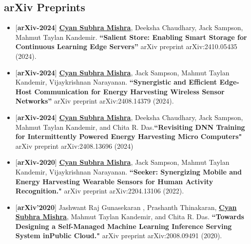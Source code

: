 \documentclass[letterpaper,11pt]{article}
\begin{document}
\subsection*{arXiv Preprints}
\begin{itemize}


\item \small{[\textbf{arXiv-2024}] \textbf{\underline{Cyan Subhra Mishra}}, Deeksha Chaudhary, Jack Sampson, Mahmut Taylan Kandemir. \textbf{``Salient Store: Enabling Smart Storage for Continuous Learning Edge Servers''} arXiv preprint arXiv:2410.05435 (2024).}

\item \small{[\textbf{arXiv-2024}] \textbf{\underline{Cyan Subhra Mishra}}, Jack Sampson, Mahmut Taylan Kandemir, Vijaykrishnan Narayanan. \textbf{``Synergistic and Efficient Edge-Host Communication for Energy Harvesting Wireless Sensor Networks''} arXiv preprint arXiv:2408.14379 (2024).}

\item \small{[\textbf{arXiv-2024}]  \textbf{\underline{Cyan Subhra Mishra}}, Deeksha Chaudhary, Jack Sampson, Mahmut Taylan Kandemir, and Chita R. Das.\textbf{``Revisiting DNN Training for Intermittently Powered Energy Harvesting Micro Computers"} arXiv preprint arXiv:2408.13696 (2024)}

\item \small{[\textbf{arXiv-2020}] \textbf{\underline{Cyan Subhra Mishra}}, Jack Sampson, Mahmut Taylan Kandemir, Vijaykrishnan Narayanan. \textbf{``Seeker: Synergizing Mobile and Energy Harvesting Wearable Sensors for Human Activity Recognition."} arXiv preprint arXiv:2204.13106 (2022).}

\item \small{[\textbf{arXiv'2020}] Jashwant Raj Gunasekaran , Prashanth Thinakaran, \textbf{\underline{Cyan Subhra Mishra}}, Mahmut Taylan Kandemir, and Chita R. Das. \textbf{``Towards Designing a Self-Managed Machine Learning Inference Serving System inPublic Cloud."} arXiv preprint arXiv:2008.09491 (2020).}


\end{itemize}
\end{document}

